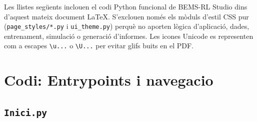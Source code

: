 \documentclass[10pt,a4paper]{article}
\begin{document}
Les llistes següents inclouen el codi Python funcional de BEMS-RL Studio dins d'aquest mateix document LaTeX. S'exclouen només els mòduls d'estil CSS pur (\texttt{page\_styles/*.py} i \texttt{ui\_theme.py}) perquè no aporten lògica d'aplicació, dades, entrenament, simulació o generació d'informes. Les icones Unicode es representen com a escapes \texttt{\textbackslash u...} o \texttt{\textbackslash U...} per evitar glifs buits en el PDF.

\section{Codi: Entrypoints i navegacio}


\subsection{\texorpdfstring{\texttt{Inici.py}}{Inici.py}}
\end{document}
